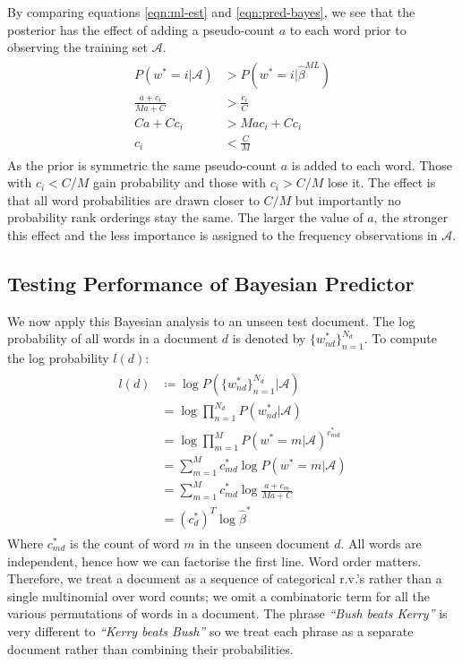 \documentclass[]{article}
\newcommand{\Acal}{\mathcal{A}}
\newcommand{\betaml}{\hat{\beta}^{ML}}
\begin{document}
%
By comparing equations \ref{eqn:ml-est} and \ref{eqn:pred-bayes}, we see that the posterior has the effect of adding a pseudo-count $a$ to each word prior to observing the training set $\Acal$.
%
\begin{align}
\begin{split}
	P(w^*=i | \Acal) &> P(w^*=i | \betaml) \\
	\frac{a + c_i}{Ma + C} &> \frac{c_i}{C} \\
	Ca + Cc_i &> Mac_i + Cc_i \\
	c_i &< \frac{C}{M}
\end{split}
\end{align}
%
As the prior is symmetric the same pseudo-count $a$ is added to each word. Those with $c_i < C/M$ gain probability and those with $c_i > C/M$ lose it. The effect is that all word probabilities are drawn closer to $C/M$ but importantly no probability rank orderings stay the same. The larger the value of $a$, the stronger this effect and the less importance is assigned to the frequency observations in $\Acal$.

\subsection{Testing Performance of Bayesian Predictor}

We now apply this Bayesian analysis to an unseen test document. The log probability of all words in a document $d$ is denoted by $\{w^*_{nd}\}_{n=1}^{N_d}$. To compute the log probability $l(d)$:
%
\begin{align}
\begin{split}
	l(d) &\coloneqq \log P(\{w^*_{nd}\}_{n=1}^{N_d} | \Acal) \\
	&= \log \prod_{n=1}^{N_d} P(w^*_{nd} | \Acal) \\
	&= \log \prod_{m = 1}^{M} P(w^*=m | \Acal)^{c^*_{md}} \\
	&= \sum_{m=1}^{M} c^*_{md} \log P(w^* = m | \Acal) \\
	&= \sum_{m=1}^{M} c^*_{md} \log \frac{a+c_m}{Ma+C} \\
	&= (c^*_d)^T \log \hat{\beta}^{*}
\end{split}
\label{eqn:test-doc-prob}
\end{align}
%
Where $c^*_{md}$ is the count of word $m$ in the unseen document $d$. All words are independent, hence how we can factorise the first line. Word order matters. Therefore, we treat a document as a sequence of categorical r.v.'s rather than a single multinomial over word counts; we omit a combinatoric term for all the various permutations of words in a document. The phrase \textit{``Bush beats Kerry''} is very different to \textit{``Kerry beats Bush''} so we treat each phrase as a separate document rather than combining their probabilities.
\end{document}
